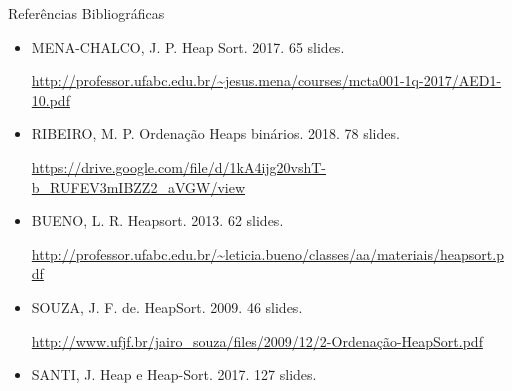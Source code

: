 \documentclass[t, 10pt]{beamer}
\begin{document}
  \begin{frame}{Referências Bibliográficas}
    \begin{itemize}      
      \item MENA-CHALCO, J\@. P. Heap Sort. 2017. 65 slides. \footnotemark[1]
      
      {\vspace{-0.5em}\fontsize{6pt}{1pt}\selectfont \url{http://professor.ufabc.edu.br/~jesus.mena/courses/mcta001-1q-2017/AED1-10.pdf}}
      
      \item RIBEIRO, M\@. P. Ordenação Heaps binários. 2018. 78 slides. \footnotemark[1]
      
      {\vspace{-0.5em}\fontsize{6pt}{1pt}\selectfont \url{https://drive.google.com/file/d/1kA4ijg20vshT-b_RUFEV3mIBZZ2_aVGW/view}}
      
      \item BUENO, L\@. R. Heapsort. 2013. 62 slides. \footnotemark[1]
      
      {\vspace{-0.5em}\fontsize{6pt}{1pt}\selectfont \url{http://professor.ufabc.edu.br/~leticia.bueno/classes/aa/materiais/heapsort.pdf}}
      
      \item SOUZA, J\@. F\@. de. HeapSort. 2009. 46 slides. \footnotemark
      
      {\vspace{-0.5em}\fontsize{6pt}{1pt}\selectfont \url{http://www.ufjf.br/jairo_souza/files/2009/12/2-Ordenação-HeapSort.pdf}}
      
      \item SANTI, J. Heap e Heap-Sort. 2017. 127 slides. \footnotemark
    \end{itemize}

  \end{frame}
\end{document}
